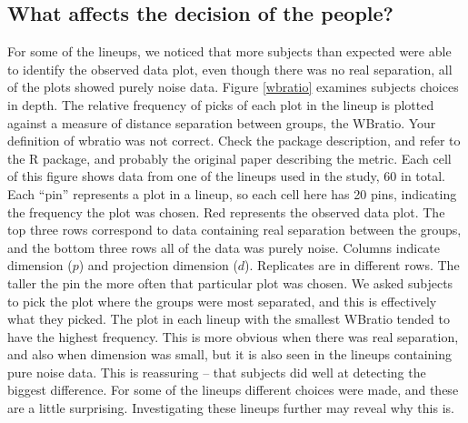 \documentclass[12]{article}
\newcommand{\blue}{\color{blue}}
\begin{document}

\subsection{What affects the decision of the people?}

\normalsize

For some of the lineups, we noticed that more subjects than expected were able to identify the observed data plot, even though there was no real separation, all of the plots showed purely noise data. Figure \ref{wbratio} examines subjects choices in depth. The  relative frequency of picks of each plot in the lineup is plotted against a measure of distance separation between groups, the WBratio. {\blue Your definition of wbratio was not correct. Check the package description, and refer to the R package, and probably the original paper describing the metric.}   Each cell of this figure shows data from one of the lineups used in the study, 60 in total. Each ``pin'' represents a plot in a lineup, so each cell here has 20 pins, indicating the frequency the plot was chosen. Red represents the observed data plot. The top three rows correspond to data containing real separation between the groups, and the bottom three rows all of the data was purely noise. Columns indicate dimension ($p$) and projection dimension ($d$). Replicates are in different rows. The taller the pin the more often that particular plot was chosen. We asked subjects to pick the plot where the groups were most separated, and this is effectively what they picked. The plot in each lineup with the smallest WBratio tended to have the highest frequency. This is more obvious when there was real separation, and also when dimension was small, but it is also seen in the lineups containing pure noise data. This is reassuring -- that subjects did well at detecting the biggest difference.  For some of the lineups different choices were made, and these are a little surprising. Investigating these lineups further may reveal why this is. 
\end{document}
